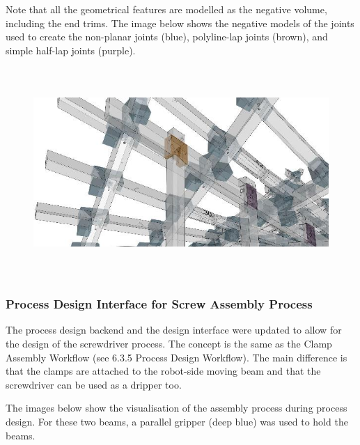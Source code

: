 \documentclass[11pt]{book}
\begin{document}
Note that all the geometrical features are modelled as the negative volume, including the end trims. The image below shows the negative models of the joints used to create the non-planar joints (blue), polyline-lap joints (brown), and simple half-lap joints (purple).

{\footnotesize \begin{figure}[H]
\includegraphics[width=15.92cm,height=7.97cm]{./images/image5.jpeg}
\end{figure}
}

\subsubsection{Process Design Interface for Screw Assembly Process}

The process design backend and the design interface were updated to allow for the design of the screwdriver process. The concept is the same as the Clamp Assembly Workflow (see 6.3.5 Process Design Workflow). The main difference is that the clamps are attached to the robot-side moving beam and that the screwdriver can be used as a dripper too.

The images below show the visualisation of the assembly process during process design. For these two beams, a parallel gripper (deep blue) was used to hold the beams.
\end{document}
